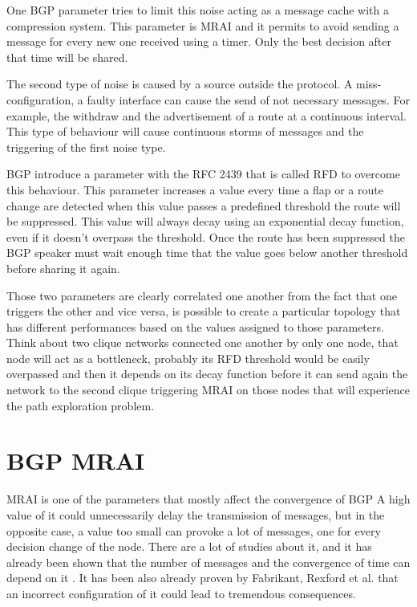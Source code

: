 One \ac{BGP} parameter tries to limit this noise acting as a message cache with
a compression system.
This parameter is \ac{MRAI} and it permits to avoid sending a message for every
new one received using a timer.
Only the best decision after that time will be shared.

The second type of noise is caused by a source outside the protocol.
A miss-configuration, a faulty interface can cause the send of not necessary messages.
For example, the withdraw and the advertisement of a route at a continuous interval.
This type of behaviour will cause continuous storms of messages and the triggering
of the first noise type.

\ac{BGP} introduce a parameter with the \ac{RFC} \num{2439} \cite{rfc2439} that
is called \ac{RFD} to overcome this behaviour.
This parameter increases a value every time a flap or a route change are detected
when this value passes a predefined threshold the route will be suppressed.
This value will always decay using an exponential decay function, even if it 
doesn't overpass the threshold.
Once the route has been suppressed the \ac{BGP} speaker must wait enough time
that the value goes below another threshold before sharing it again.

Those two parameters are clearly correlated one another from the fact that
one triggers the other and vice versa, is possible to create a particular topology
that has different performances based on the values assigned to those 
parameters.
Think about two clique networks connected one another by only one node, that
node will act as a bottleneck, probably its \ac{RFD} threshold would be easily
overpassed and then it depends on its decay function before it can send
again the network to the second clique triggering \ac{MRAI} on those nodes that
will experience the path exploration problem.


\section{BGP MRAI}
\label{sec:bgp_mrai}

\ac{MRAI} is one of the parameters that mostly affect the convergence of \ac{BGP}
A high value of it could unnecessarily delay the transmission of messages, but
in the opposite case, a value too small can provoke a lot of messages, one for
every decision change of the node.
There are a lot of studies about it, and it has already been shown that
the number of messages and the convergence of time can depend on it \cite{griffin2001experimental}.
It has been also already proven by Fabrikant, Rexford et al. \cite{fabrikant2011there} 
that an incorrect configuration of it could lead to tremendous consequences.

